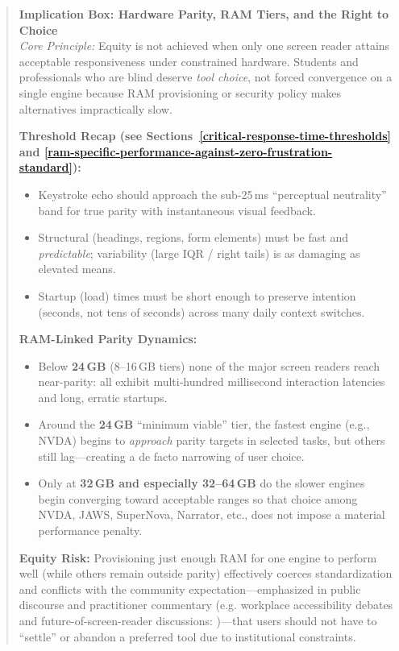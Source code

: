 \begin{quote}
	\textbf{Implication Box: Hardware Parity, RAM Tiers, and the Right to Choice}\\[2pt]
	\textit{Core Principle:} Equity is not achieved when only one screen reader attains acceptable responsiveness under constrained hardware. Students and professionals who are blind deserve \emph{tool choice}, not forced convergence on a single engine because RAM provisioning or security policy makes alternatives impractically slow.\par
	\textbf{Threshold Recap (see Sections~\ref{critical-response-time-thresholds} and \ref{ram-specific-performance-against-zero-frustration-standard}):}
	\begin{itemize}
		\item Keystroke echo should approach the sub‑25\,ms “perceptual neutrality” band for true parity with instantaneous visual feedback.
		\item Structural  (headings, regions, form elements) must be fast and \emph{predictable}; variability (large IQR / right tails) is as damaging as elevated means.
		\item Startup (load) times must be short enough to preserve intention (seconds, not tens of seconds) across many daily context switches.
	\end{itemize}
	\textbf{RAM-Linked Parity Dynamics:}
	\begin{itemize}
		\item Below \textbf{24\,GB} (8–16\,GB tiers) none of the major screen readers reach near-parity: all exhibit multi‑hundred millisecond interaction latencies and long, erratic startups.
		\item Around the \textbf{24\,GB} “minimum viable” tier, the fastest engine (e.g., NVDA) begins to \emph{approach} parity targets in selected tasks, but others still lag—creating a de facto narrowing of user choice.
		\item Only at \textbf{32\,GB and especially 32–64\,GB} do the slower engines begin converging toward acceptable ranges so that choice among NVDA, JAWS, SuperNova, Narrator, etc., does not impose a material performance penalty.
	\end{itemize}
	\textbf{Equity Risk:} Provisioning just enough RAM for one engine to perform well (while others remain outside parity) effectively coerces standardization and conflicts with the community expectation—emphasized in public discourse and practitioner commentary (e.g. workplace accessibility debates and future-of-screen-reader discussions: \supercite{doubletap2023studio,doubletap2023workplace})—that users should not have to “settle” or abandon a preferred tool due to institutional constraints.\par

\end{quote}
